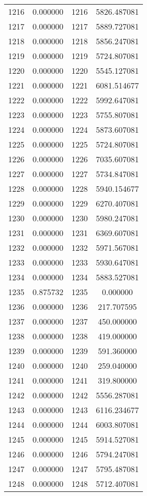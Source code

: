 \documentclass[12pt]{article}
\begin{document}
\begin{longtable}{@{}cccc@{}}
1216 & 0.000000 & 1216 & 5826.487081 \\
1217 & 0.000000 & 1217 & 5889.727081 \\
1218 & 0.000000 & 1218 & 5856.247081 \\
1219 & 0.000000 & 1219 & 5724.807081 \\
1220 & 0.000000 & 1220 & 5545.127081 \\
1221 & 0.000000 & 1221 & 6081.514677 \\
1222 & 0.000000 & 1222 & 5992.647081 \\
1223 & 0.000000 & 1223 & 5755.807081 \\
1224 & 0.000000 & 1224 & 5873.607081 \\
1225 & 0.000000 & 1225 & 5724.807081 \\
1226 & 0.000000 & 1226 & 7035.607081 \\
1227 & 0.000000 & 1227 & 5734.847081 \\
1228 & 0.000000 & 1228 & 5940.154677 \\
1229 & 0.000000 & 1229 & 6270.407081 \\
1230 & 0.000000 & 1230 & 5980.247081 \\
1231 & 0.000000 & 1231 & 6369.607081 \\
1232 & 0.000000 & 1232 & 5971.567081 \\
1233 & 0.000000 & 1233 & 5930.647081 \\
1234 & 0.000000 & 1234 & 5883.527081 \\
1235 & 0.875732 & 1235 & 0.000000 \\
1236 & 0.000000 & 1236 & 217.707595 \\
1237 & 0.000000 & 1237 & 450.000000 \\
1238 & 0.000000 & 1238 & 419.000000 \\
1239 & 0.000000 & 1239 & 591.360000 \\
1240 & 0.000000 & 1240 & 259.040000 \\
1241 & 0.000000 & 1241 & 319.800000 \\
1242 & 0.000000 & 1242 & 5556.287081 \\
1243 & 0.000000 & 1243 & 6116.234677 \\
1244 & 0.000000 & 1244 & 6003.807081 \\
1245 & 0.000000 & 1245 & 5914.527081 \\
1246 & 0.000000 & 1246 & 5794.247081 \\
1247 & 0.000000 & 1247 & 5795.487081 \\
1248 & 0.000000 & 1248 & 5712.407081 \\

\end{longtable}
\end{document}
